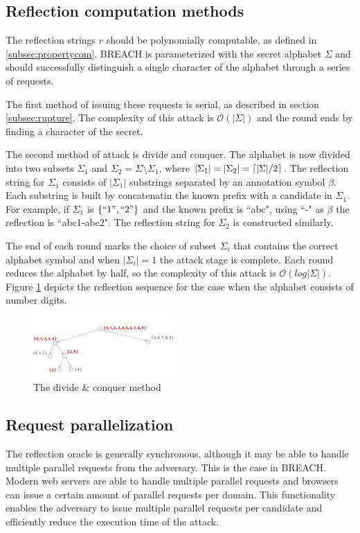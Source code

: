 \subsection{Reflection computation methods}\label{subsec:reflectionmethods}
The reflection strings $r$ should be polynomially computable, as defined in
\ref{subsec:propertycom}. BREACH is parameterized with the secret alphabet
$\Sigma$ and should successfully distinguish a single character of the alphabet
through a series of requests.

The first method of issuing these requests is serial, as described in section
\ref{subsec:rupture}.  The complexity of this attack is $\mathcal{O}(|\Sigma|)$
and the round ends by finding a character of the secret.

The second method of attack is divide and conquer. The alphabet is now divided
into two subsets $\Sigma_1$ and $\Sigma_2 = \Sigma \setminus \Sigma_1$, where
$|\Sigma_1| = |\Sigma_2| = \lceil|\Sigma| / 2\rceil$. The reflection string for
$\Sigma_1$ consists of $|\Sigma_1|$ substrings separated by an annotation symbol
$\beta$. Each substring is built by concatenatin the known prefix with a
candidate in $\Sigma_1$. For example, if $\Sigma_1$ is $\{``1", ``2"\}$ and the
known prefix is ``abc", using ``-" as $\beta$ the reflection is ``abc1-abc2".
The reflection string for $\Sigma_2$ is constructed similarly.

The end of each round marks the choice of subset $\Sigma_i$ that contains the
correct alphabet symbol and when $|\Sigma_i| = 1$ the attack stage is complete.
Each round reduces the alphabet by half, so the complexity of this attack is
$\mathcal{O}(log|\Sigma|)$. Figure \ref{fig:divide_and_conquer} depicts the
reflection sequence for the case when the alphabet consists of number digits.

   \begin{figure}[thpb]
      \centering
          \includegraphics[width=0.48\textwidth]{figures/divide_and_conquer.png}
      \caption{The divide \& conquer method}
      \label{fig:divide_and_conquer}
   \end{figure}

\subsection{Request parallelization}\label{subsec:parallel}
The reflection oracle is generally synchronous, although it may be able to
handle multiple parallel requests from the adversary.  This is the case in
BREACH. Modern web servers are able to handle multiple parallel requests and
browsers can issue a certain amount of parallel requests per domain. This
functionality enables the adversary to issue multiple parallel requests per
candidate and efficiently reduce the execution time of the attack.

